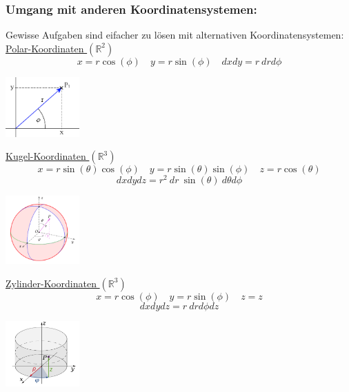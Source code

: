 \documentclass[6pt]{article}
\begin{document}
\begin{multicols*}{3}
		
		\vspace{5mm}
		\quad
		
		\columnbreak
		
		\subsubsection*{Umgang mit anderen Koordinatensystemen:}
		Gewisse Aufgaben sind eifacher zu l{\"o}sen mit alternativen Koordinatensystemen: \\
		
		
		\underline{Polar-Koordinaten $\left(\mathbb{R}^2\right)$} \vspace{1mm}\\
		\[
			x = r\cos(\phi) \quad  y = r\sin(\phi) \quad dxdy = r\ drd\phi
		\]
		\begin{center}
					\includegraphics[width=80pt]{images/polarkoord}	
		\end{center}


		
		
		\underline{Kugel-Koordinaten $\left(\mathbb{R}^3\right)$} \vspace{1mm}\\
		\[
			x = r\sin(\theta)\cos(\phi) \quad y = r\sin(\theta)\sin(\phi) \quad z = r\cos(\theta)
		\]
		\[
			dxdydz = r^2\ dr\ \sin(\theta)\ d\theta d\phi
		\]
		\begin{center}
					\includegraphics[width=80pt]{images/kugelkoord}	
		\end{center}
		
		\underline{Zylinder-Koordinaten $\left(\mathbb{R}^3\right)$} \vspace{1mm}\\
		\[
			x = r\cos(\phi) \quad y = r\sin(\phi) \quad z = z
		\]
		\[
			dxdydz = r\ drd\phi dz
		\]
		\begin{center}
					\includegraphics[width=80pt]{images/zylinderkoord}	
		\end{center}
		

\end{multicols*}
\end{document}
